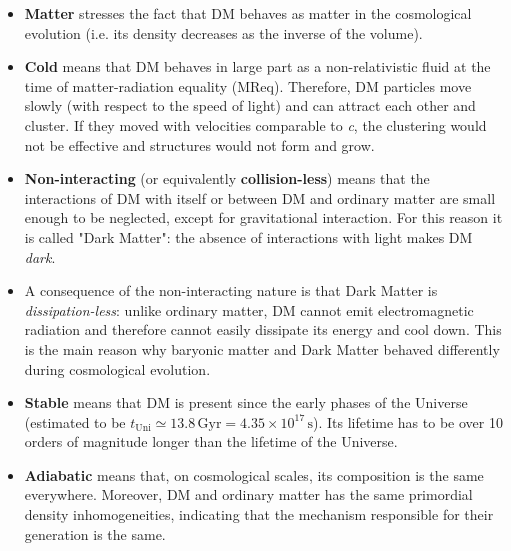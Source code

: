 \begin{itemize}
    \item \textbf{Matter} stresses the fact that DM behaves as matter in the cosmological evolution (i.e. its density decreases as the inverse of the volume).
   
    \item \textbf{Cold} means that DM behaves in large part as a non-relativistic fluid at the time of matter-radiation equality (MReq). Therefore, DM particles move slowly (with respect to the speed of light) and can attract each other and cluster. If they moved with velocities comparable to \emph{c}, the clustering would not be effective and structures would not form and grow.
   
    \item \textbf{Non-interacting} (or equivalently \textbf{collision-less}) means that the interactions of DM with itself or between DM and ordinary matter are small enough to be neglected, except for gravitational interaction. For this reason it is called "Dark Matter": the absence of interactions with light makes DM \emph{dark}.
    
    \item A consequence of the non-interacting nature is that Dark Matter is \emph{dissipation-less}: unlike ordinary matter, DM cannot emit electromagnetic radiation and therefore cannot easily dissipate its energy and cool down. This is the main reason why baryonic matter and Dark Matter behaved differently during cosmological evolution.
    
    \item \textbf{Stable} means that DM is present since the early phases of the Universe (estimated to be $t_{\mathrm{Uni}} \simeq 13.8\,\mathrm{Gyr} = 4.35 \times 10^{17}\,\mathrm{s}$). Its lifetime has to be over 10 orders of magnitude longer than the lifetime of the Universe.
    
    \item \textbf{Adiabatic} means that, on cosmological scales, its composition is the same everywhere. Moreover, DM and ordinary matter has the same primordial density inhomogeneities, indicating that the mechanism responsible for their generation is the same.
    
\end{itemize}

